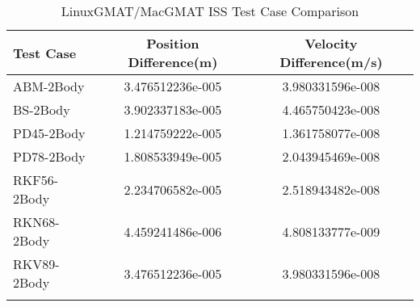\begin{table}[htbp!]
\centering
\caption{ LinuxGMAT/MacGMAT ISS Test Case Comparison}
      \begin{tabular}{lcc}
      \hline\hline
          Test Case & Position Difference(m) & Velocity Difference(m/s) \\
         \hline
         ABM-2Body & 3.476512236e-005 & 3.980331596e-008 \\
         BS-2Body & 3.902337183e-005 & 4.465750423e-008 \\
         PD45-2Body & 1.214759222e-005 & 1.361758077e-008 \\
         PD78-2Body & 1.808533949e-005 & 2.043945469e-008 \\
         RKF56-2Body & 2.234706582e-005 & 2.518943482e-008 \\
         RKN68-2Body & 4.459241486e-006 & 4.808133777e-009 \\
         RKV89-2Body & 3.476512236e-005 & 3.980331596e-008 \\
      \hline\hline
      \label{Table: ISS LinuxGMAT-MacGMAT Table} 
\end{tabular}
\end{table}
